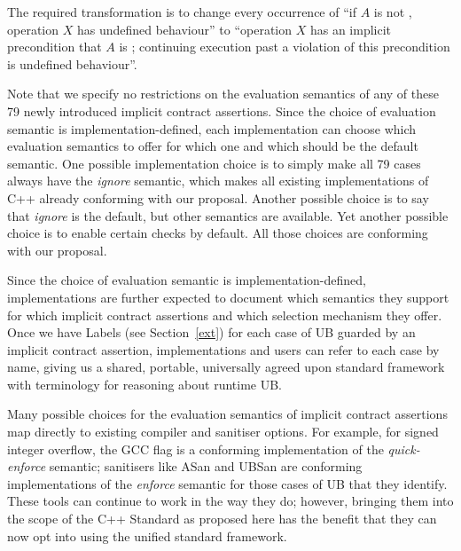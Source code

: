 The required transformation is to change every occurrence of “if $A$ is not , operation $X$ has undefined behaviour'' to ``operation $X$ has an implicit precondition that $A$ is ; continuing execution past a violation of this precondition is undefined behaviour''.

Note that we specify no restrictions on the evaluation semantics of any of these 79 newly introduced  implicit contract assertions. Since the choice of evaluation semantic is implementation-defined, each implementation can choose which evaluation semantics to offer for which one and which should be the default semantic. One possible implementation choice is to simply make all 79 cases always have the \emph{ignore} semantic, which makes all existing implementations of C++ already conforming with our proposal. Another possible choice is to say that  \emph{ignore} is the default, but other semantics are available. Yet another possible choice is to enable certain checks by default. All those choices are conforming with our proposal.

Since the choice of evaluation semantic is  implementation-defined, implementations are further expected to document which semantics they support for which implicit contract assertions and which selection mechanism they offer. Once we have Labels (see Section~\ref{ext}) for each case of UB guarded by an implicit contract assertion, implementations and users can refer to each case by name, giving us a shared, portable, universally agreed upon standard framework with terminology for reasoning about runtime UB.

Many possible choices for the evaluation semantics of implicit contract assertions map directly to existing compiler and sanitiser options. For example, for signed integer overflow, the GCC flag  is a conforming implementation of the \emph{quick-enforce} semantic; sanitisers like ASan and UBSan are conforming implementations of the \emph{enforce} semantic for those cases of UB that they identify. These tools can continue to work in the way they do; however, bringing them into the scope of the C++ Standard as proposed here has the benefit that they can now opt into using the unified standard framework.

